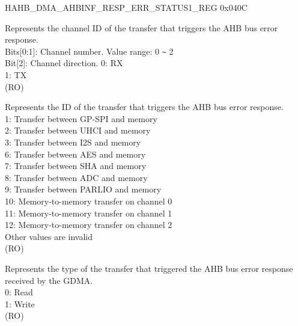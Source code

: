 \begin{register}{H}{AHB\_DMA\_AHBINF\_RESP\_ERR\_STATUS1\_REG} {0x040C}\label{regdesc:AHBDMAAHBINFRESPERRSTATUS1REG}
%
%
%
%
\regnewline%
\begin{regdesc}\begin{reglist}
\label{fielddesc:AHBDMAAHBINFRESPERRCHID}\item [AHB\_DMA\_AHBINF\_RESP\_ERR\_CH\_ID] Represents the channel ID of the transfer that triggers the AHB bus error response.\\
Bits[0:1]: Channel number. Value range: 0 \verb+~+ 2\\
Bit[2]: Channel direction.
0: RX\\
1: TX\\ (RO)
\label{fielddesc:AHBDMAAHBINFRESPERRID}\item [AHB\_DMA\_AHBINF\_RESP\_ERR\_ID] Represents the ID of the transfer that triggers the AHB bus error response.\\
1: Transfer between GP-SPI and memory\\
2: Transfer between UHCI and memory\\
3: Transfer between I2S and memory\\
6: Transfer between AES and memory\\
7: Transfer between SHA and memory\\
8: Transfer between ADC and memory\\
9: Transfer between PARLIO and memory\\
10: Memory-to-memory transfer on channel 0\\
11: Memory-to-memory transfer on channel 1\\
12: Memory-to-memory transfer on channel 2\\
Other values are invalid\\
(RO)
\label{fielddesc:AHBDMAAHBINFRESPERRWR}\item [AHB\_DMA\_AHBINF\_RESP\_ERR\_WR] Represents the type of the transfer that triggered the AHB bus error response received by the GDMA.\\
0: Read\\
1: Write\\ (RO)
\end{reglist}\end{regdesc}
\end{register}


